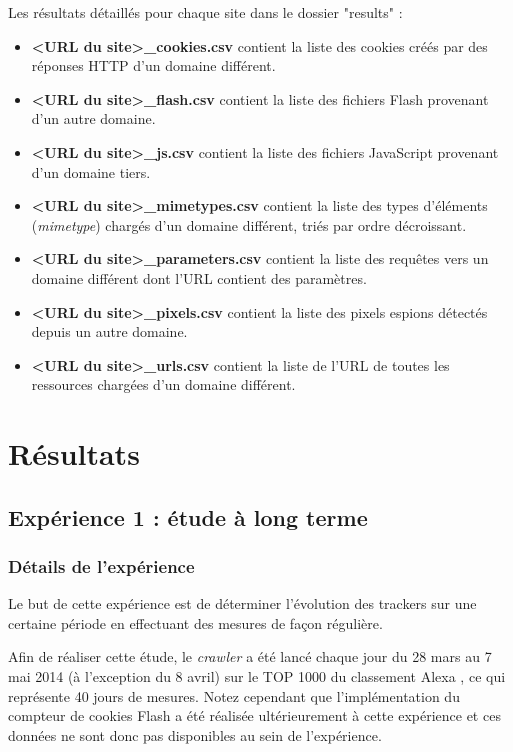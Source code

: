 Les résultats détaillés pour chaque site dans le dossier "results" :
\begin{itemize}
	\item \textbf{<URL du site>\_cookies.csv} contient la liste des cookies créés par des réponses HTTP d'un domaine différent.
	\item \textbf{<URL du site>\_flash.csv} contient la liste des fichiers Flash provenant d'un autre domaine.
	\item \textbf{<URL du site>\_js.csv} contient la liste des fichiers JavaScript provenant d'un domaine tiers.
	\item \textbf{<URL du site>\_mimetypes.csv} contient la liste des types d'éléments (\textit{mimetype}) chargés d'un domaine différent, triés par ordre décroissant.
	\item \textbf{<URL du site>\_parameters.csv} contient la liste des requêtes vers un domaine différent dont l'URL contient des paramètres.
	\item \textbf{<URL du site>\_pixels.csv} contient la liste des pixels espions détectés depuis un autre domaine.
	\item \textbf{<URL du site>\_urls.csv} contient la liste de l'URL de toutes les ressources chargées d'un domaine différent.
	\newline
\end{itemize}

\section{Résultats}

\subsection{Expérience 1 : étude à long terme}
\subsubsection{Détails de l'expérience}
Le but de cette expérience est de déterminer l'évolution des trackers sur une certaine période en effectuant des mesures de façon régulière.

Afin de réaliser cette étude, le \textit{crawler} a été lancé chaque jour du 28 mars au 7 mai 2014 (à l'exception du 8 avril) sur le TOP 1000 du classement Alexa \cite{AlexaTop}, ce qui représente 40 jours de mesures. Notez cependant que l'implémentation du compteur de cookies Flash a été réalisée ultérieurement à cette expérience et ces données ne sont donc pas disponibles au sein de l'expérience.
\newline

